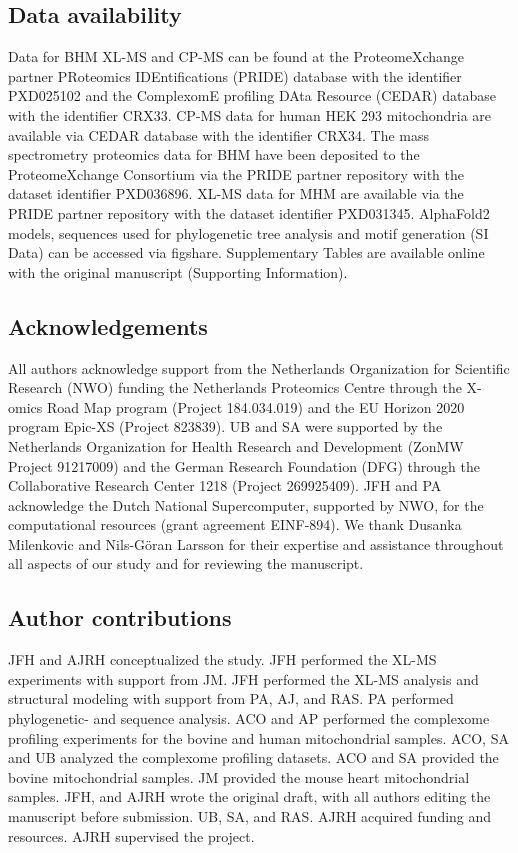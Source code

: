 \subsection*{Data availability}
Data for BHM XL-MS and CP-MS can be found at the ProteomeXchange partner PRoteomics IDEntifications (PRIDE) database with the identifier PXD025102 and the ComplexomE profiling DAta Resource (CEDAR) database with the identifier CRX33. CP-MS data for human HEK 293 mitochondria are available via CEDAR database with the identifier CRX34. The mass spectrometry proteomics data for BHM have been deposited to the ProteomeXchange Consortium via the PRIDE partner repository with the dataset identifier PXD036896. XL-MS data for MHM are available via the PRIDE partner repository with the dataset identifier PXD031345. AlphaFold2 models, sequences used for phylogenetic tree analysis and motif generation (SI Data) can be accessed via figshare. Supplementary Tables are available online with the original manuscript (Supporting Information).
%
\subsection*{Acknowledgements}
All authors acknowledge support from the Netherlands Organization for Scientific Research (NWO) funding the Netherlands Proteomics Centre through the X-omics Road Map program (Project 184.034.019) and the EU Horizon 2020 program Epic-XS (Project 823839). UB and SA were supported by the Netherlands Organization for Health Research and Development (ZonMW Project 91217009) and the German Research Foundation (DFG) through the Collaborative Research Center 1218 (Project 269925409). JFH and PA acknowledge the Dutch National Supercomputer, supported by NWO, for the computational resources (grant agreement EINF-894). We thank Dusanka Milenkovic and Nils-Göran Larsson for their expertise and assistance throughout all aspects of our study and for reviewing the manuscript.
%
\subsection*{Author contributions}
JFH and AJRH conceptualized the study. JFH performed the XL-MS experiments with support from JM. JFH performed the XL-MS analysis and structural modeling with support from PA, AJ, and RAS. PA performed phylogenetic- and sequence analysis. ACO and AP performed the complexome profiling experiments for the bovine and human mitochondrial samples. ACO, SA and UB analyzed the complexome profiling datasets. ACO and SA provided the bovine mitochondrial samples. JM provided the mouse heart mitochondrial samples. JFH, and AJRH wrote the original draft, with all authors editing the manuscript before submission. UB, SA, and RAS. AJRH acquired funding and resources. AJRH supervised the project.
%    
